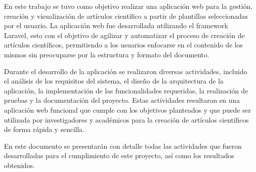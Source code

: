 En este trabajo se tuvo como objetivo realizar una aplicación web para la gestión, creación y visualización de artículos científico a partir de plantillas seleccionadas por el usuario. La aplicación web fue desarrollada utilizando el framework Laravel, esto con el objetivo de agilizar y automatizar el proceso de creación de artículos científicos, permitiendo a los usuarios enfocarse en el contenido de los mismos sin preocuparse por la estructura y formato del documento. 

Durante el desarrollo de la aplicación se realizaron diversas actividades, incluido el análisis de los requisitos del sistema, el diseño de la arquitectura de la aplicación, la implementación de las funcionalidades requeridas, la realización de pruebas y la documentación del proyecto. Estas actividades resultaron en una aplicación web funcional que cumple con los objetivos planteados y que puede ser utilizada por investigadores y académicos para la creación de artículos científicos de forma rápida y sencilla.

En este documento se presentarán con detalle todas las actividades que fueron desarrolladas para el cumplimiento de este proyecto, así como los resultados obtenidos.

